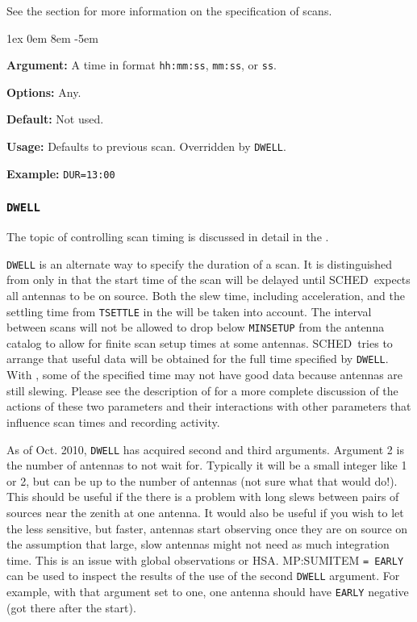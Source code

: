 \documentclass{report}
\newcommand{\schedb}{{\sc SCHED~}}
\newcommand{\rcwbox}[5]{
  \begin{list}{}{\parsep 1ex  \itemsep 0em
                 \leftmargin 8em  \itemindent -5em }
    \item {\bf Argument:} #1
    \item {\bf Options:}  #2
    \item {\bf Default:}  #3
    \item {\bf Usage:}    #4
    \item {\bf Example:}  #5
  \end{list}
}
\begin{document}
See the  section for more
information on the specification of scans.

\rcwbox
{A time in format {\tt hh:mm:ss}, {\tt mm:ss}, or {\tt ss}.}
{Any.}
{Not used.}
{Defaults to previous scan. Overridden by {\tt DWELL}.}
{{\tt DUR=13:00}}


\subsubsection{\label{MP:DWELL}{\tt DWELL}}

The topic of controlling scan timing is discussed in detail in
the .

{\tt DWELL} is an alternate way to specify the duration of a scan.  It
is distinguished from  only in that
the start time of the scan will be delayed until \schedb expects all
antennas to be on source.  Both the slew time, including acceleration,
and the settling time from {\tt TSETTLE} in the  will be taken into account.  The interval between
scans will not be allowed to drop below {\tt MINSETUP} from the
antenna catalog to allow for finite scan setup times at some antennas.
\schedb tries to arrange that useful data will be obtained for the
full time specified by {\tt DWELL}.  With , some of the specified time may not have good data
because antennas are still slewing.  Please see the description of
 for a more complete discussion of the
actions of these two parameters and their interactions with other
parameters that influence scan times and recording activity.

As of Oct. 2010, {\tt DWELL} has acquired second and third arguments.
Argument 2 is the number of antennas to not wait for.  Typically it
will be a small integer like 1 or 2, but can be up to the number of
antennas (not sure what that would do!).  This should be useful if the
there is a problem with long slews between pairs of sources near the
zenith at one antenna.  It would also be useful if you wish to let the
less sensitive, but faster, antennas start observing once they are on
source on the assumption that large, slow antennas might not need as
much integration time.  This is an issue with global observations or
HSA.   {MP:SUMITEM} {\tt = EARLY} can be used
to inspect the results of the use of the second {\tt DWELL} argument.
For example, with that argument set to one, one antenna should have
{\tt EARLY} negative (got there after the start).
\end{document}
